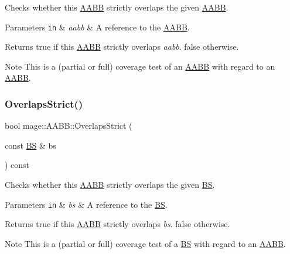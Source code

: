 Checks whether this \hyperlink{structmage_1_1_a_a_b_b}{A\+A\+BB} strictly overlaps the given \hyperlink{structmage_1_1_a_a_b_b}{A\+A\+BB}.


\begin{DoxyParams}[1]{Parameters}
\mbox{\tt in}  & {\em aabb} & A reference to the \hyperlink{structmage_1_1_a_a_b_b}{A\+A\+BB}. \\
\hline
\end{DoxyParams}
\begin{DoxyReturn}{Returns}
{\ttfamily true} if this \hyperlink{structmage_1_1_a_a_b_b}{A\+A\+BB} strictly overlaps {\itshape aabb}. {\ttfamily false} otherwise. 
\end{DoxyReturn}
\begin{DoxyNote}{Note}
This is a (partial or full) coverage test of an \hyperlink{structmage_1_1_a_a_b_b}{A\+A\+BB} with regard to an \hyperlink{structmage_1_1_a_a_b_b}{A\+A\+BB}. 
\end{DoxyNote}
\hypertarget{structmage_1_1_a_a_b_b_ac2f7270ec51acb91aed4965f135a53a9}{}\label{structmage_1_1_a_a_b_b_ac2f7270ec51acb91aed4965f135a53a9} 
\subsubsection{\texorpdfstring{Overlaps\+Strict()}{OverlapsStrict()}\hspace{0.1cm}{\footnotesize\ttfamily [2/2]}}
{\footnotesize\ttfamily bool mage\+::\+A\+A\+B\+B\+::\+Overlaps\+Strict (\begin{DoxyParamCaption}\item[{const \hyperlink{structmage_1_1_b_s}{BS} \&}]{bs }\end{DoxyParamCaption}) const\hspace{0.3cm}{\ttfamily [noexcept]}}

Checks whether this \hyperlink{structmage_1_1_a_a_b_b}{A\+A\+BB} strictly overlaps the given \hyperlink{structmage_1_1_b_s}{BS}.


\begin{DoxyParams}[1]{Parameters}
\mbox{\tt in}  & {\em bs} & A reference to the \hyperlink{structmage_1_1_b_s}{BS}. \\
\hline
\end{DoxyParams}
\begin{DoxyReturn}{Returns}
{\ttfamily true} if this \hyperlink{structmage_1_1_a_a_b_b}{A\+A\+BB} strictly overlaps {\itshape bs}. {\ttfamily false} otherwise. 
\end{DoxyReturn}
\begin{DoxyNote}{Note}
This is a (partial or full) coverage test of a \hyperlink{structmage_1_1_b_s}{BS} with regard to an \hyperlink{structmage_1_1_a_a_b_b}{A\+A\+BB}. 
\end{DoxyNote}


